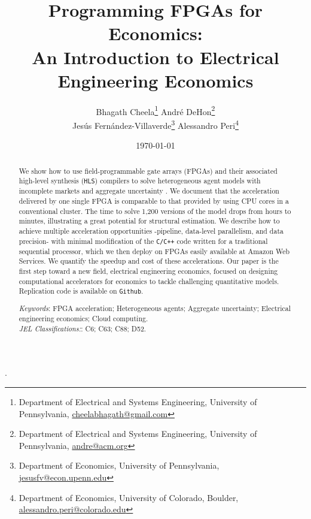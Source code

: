 \documentclass[12pt,american]{article}
\makeatletter
\newcommand{\resultsfolder}{./results}
\newcommand{\baselinespeedupFPGAICPUI}{\@\xspace}
\newcommand{\cpuItimehoursminutes}{ hours\@\xspace}
\newcommand{\fpgaItimehoursminutes}{ minutes\@\xspace}
\makeatother
\begin{document}
\title{Programming FPGAs for Economics:\\
\vspace{0.1in}
An Introduction to Electrical Engineering Economics}

\author{Bhagath Cheela\thanks{Department of Electrical and Systems Engineering, University of Pennsylvania, \textcolor{blue}{\href{mailto:cheelabhagath@gmail.com}{cheelabhagath@gmail.com}}}
\hspace{2cm}
Andr\'e DeHon\thanks{Department of Electrical and Systems Engineering, University of Pennsylvania, \textcolor{blue}{\href{mailto:andre@acm.org}{andre@acm.org}}}\\
\hspace{-1cm}Jes\'us Fern\'andez-Villaverde\thanks{Department of Economics, University of Pennsylvania, \textcolor{blue}{\href{mailto:jesusfv@econ.upenn.edu}{jesusfv@econ.upenn.edu}}}
\hspace{0.6cm}
Alessandro Peri\thanks{Department of Economics, University of Colorado, Boulder,
\textcolor{blue}{\href{mailto:alessandro.peri@colorado.edu}{alessandro.peri@colorado.edu}}}}

\date{\today} 


.

\maketitle

\begin{abstract}
\noindent We show how to use field-programmable gate arrays (FPGAs) and their associated high-level synthesis (\texttt{HLS}) compilers to solve heterogeneous agent models with incomplete markets and aggregate uncertainty \citep{KrusellSmith1998}. We document that the acceleration delivered by one single FPGA is comparable to that provided by using \baselinespeedupFPGAICPUI\hspace{-0.1cm} CPU cores in a conventional cluster. The time to solve 1,200 versions of the model drops from \cpuItimehoursminutes to \fpgaItimehoursminutes, illustrating a great potential for structural estimation. We describe how to achieve multiple acceleration opportunities -pipeline, data-level parallelism, and data precision- with minimal modification of the \texttt{C/C++} code written for a traditional sequential processor, which we then deploy on FPGAs easily available at Amazon Web Services. We quantify the speedup and cost of these accelerations. Our paper is the first step toward a new field, electrical engineering economics, focused on designing computational accelerators for economics to tackle challenging quantitative models. Replication code is available on \texttt{Github}.

\noindent \textit{Keywords}{\small: FPGA acceleration; Heterogeneous agents; Aggregate uncertainty; Electrical engineering economics; Cloud computing.}\\
\textit{JEL Classifications:}{\small:  C6; C63; C88; D52.}
\end{abstract}
\end{document}
